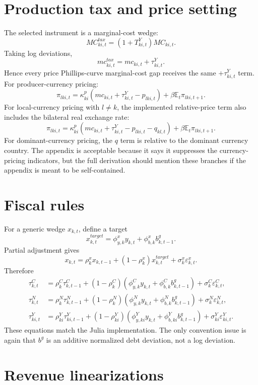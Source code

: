 \documentclass[11pt]{article}
\newcommand{\E}{\mathbb E}
\newcommand{\TY}{T^Y}
\newcommand{\tauc}{\tau^C}
\newcommand{\taun}{\tau^N}
\newcommand{\tauy}{\tau^Y}
\newcommand{\bg}{b^g}
\newcommand{\MC}{MC}
\begin{document}
\section{Production tax and price setting}

The selected instrument is a marginal-cost wedge:
\[
  \MC^{tax}_{k i,t}=(1+\TY_{k i,t})\MC_{k i,t}.
\]
Taking log deviations,
\[
  mc^{tax}_{k i,t}
  =
  mc_{k i,t}+\tauy_{k i,t}.
\]
Hence every price Phillips-curve marginal-cost gap receives the same
\(+\tauy_{k i,t}\) term. For producer-currency pricing:
\[
  \pi_{lki,t}
  =
  \kappa^p_{ki}(mc_{ki,t}+\tauy_{ki,t}-p_{lki,t})
  +\beta\E_t\pi_{lki,t+1}.
\]
For local-currency pricing with \(l\ne k\), the implemented relative-price term
also includes the bilateral real exchange rate:
\[
  \pi_{lki,t}
  =
  \kappa^p_{ki}(mc_{ki,t}+\tauy_{ki,t}-p_{lki,t}-q_{kl,t})
  +\beta\E_t\pi_{lki,t+1}.
\]
For dominant-currency pricing, the \(q\) term is relative to the dominant
currency country. The appendix is acceptable because it says it suppresses the
currency-pricing indicators, but the full derivation should mention these
branches if the appendix is meant to be self-contained.

\section{Fiscal rules}

For a generic wedge \(x_{k,t}\), define a target
\[
  x^{target}_{k,t}
  =
  \phi^x_{y,k}y_{k,t}
  +
  \phi^x_{b,k}\bg_{k,t-1}.
\]
Partial adjustment gives
\[
  x_{k,t}
  =
  \rho^x_k x_{k,t-1}
  +(1-\rho^x_k)x^{target}_{k,t}
  +\sigma^x_k\varepsilon^x_{k,t}.
\]
Therefore
\begin{align}
  \tauc_{k,t}
  &=
  \rho^C_k\tauc_{k,t-1}
  +(1-\rho^C_k)(\phi^C_{y,k}y_{k,t}+\phi^C_{b,k}\bg_{k,t-1})
  +\sigma^C_k\varepsilon^C_{k,t}, \\
  \taun_{k,t}
  &=
  \rho^N_k\taun_{k,t-1}
  +(1-\rho^N_k)(\phi^N_{y,k}y_{k,t}+\phi^N_{b,k}\bg_{k,t-1})
  +\sigma^N_k\varepsilon^N_{k,t}, \\
  \tauy_{k i,t}
  &=
  \rho^Y_{k i}\tauy_{k i,t-1}
  +(1-\rho^Y_{k i})(\phi^Y_{y,k i}y_{k,t}+\phi^Y_{b,k i}\bg_{k,t-1})
  +\sigma^Y_{k i}\varepsilon^Y_{k i,t}.
\end{align}
These equations match the Julia implementation. The only convention issue is
again that \(\bg\) is an additive normalized debt deviation, not a log deviation.

\section{Revenue linearizations}
\end{document}
